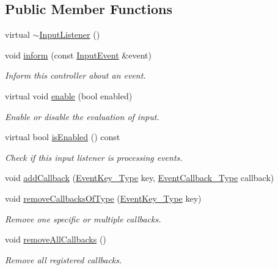 \subsection*{Public Member Functions}
\begin{DoxyCompactItemize}
\item 
virtual \mbox{\hyperlink{classec_1_1_input_listener_afd65ca201e735f5758646d6653f42804}{$\sim$\+Input\+Listener}} ()
\item 
void \mbox{\hyperlink{classec_1_1_input_listener_a39e0803651e945e177336df2cf84d61b}{inform}} (const \mbox{\hyperlink{structec_1_1_input_event}{Input\+Event}} \&event)
\begin{DoxyCompactList}\small\item\em Inform this controller about an event. \end{DoxyCompactList}\item 
virtual void \mbox{\hyperlink{classec_1_1_input_listener_a459a44443e7de70e854c2175b6c6914d}{enable}} (bool enabled)
\begin{DoxyCompactList}\small\item\em Enable or disable the evaluation of input. \end{DoxyCompactList}\item 
virtual bool \mbox{\hyperlink{classec_1_1_input_listener_a6d7a4e04543e3a86745261d9fefcbfc1}{is\+Enabled}} () const
\begin{DoxyCompactList}\small\item\em Check if this input listener is processing events. \end{DoxyCompactList}\item 
void \mbox{\hyperlink{classec_1_1_input_listener_a803faa5cc3d7576a603944cc378a7246}{add\+Callback}} (\mbox{\hyperlink{classec_1_1_input_listener_af5dfb691564fa8e05fcf7f053e3c532b}{Event\+Key\+\_\+\+Type}} key, \mbox{\hyperlink{classec_1_1_input_listener_aa622615b11dfc5cd1dce423fafe27c93}{Event\+Callback\+\_\+\+Type}} callback)
\item 
void \mbox{\hyperlink{classec_1_1_input_listener_a66e75fbfd13ec7cf87be9bebf2e02be8}{remove\+Callbacks\+Of\+Type}} (\mbox{\hyperlink{classec_1_1_input_listener_af5dfb691564fa8e05fcf7f053e3c532b}{Event\+Key\+\_\+\+Type}} key)
\begin{DoxyCompactList}\small\item\em Remove one specific or multiple callbacks. \end{DoxyCompactList}\item 
void \mbox{\hyperlink{classec_1_1_input_listener_ab3c4085477da60677e0a0659f750ead4}{remove\+All\+Callbacks}} ()
\begin{DoxyCompactList}\small\item\em Remove all registered callbacks. \end{DoxyCompactList}\end{DoxyCompactItemize}
